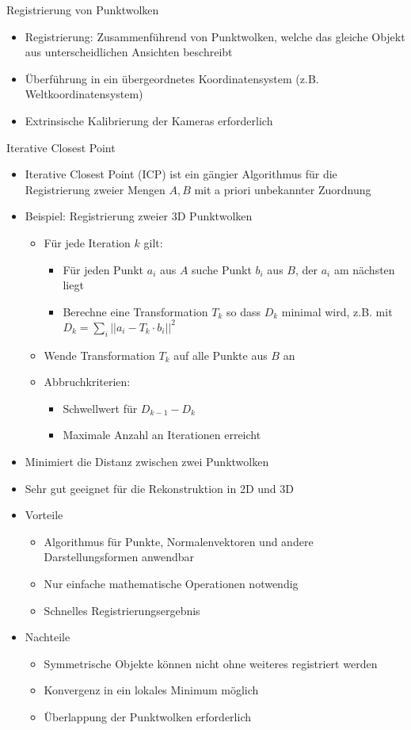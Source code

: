 \documentclass[paper=a4, fontsize=11pt]{scrartcl} %
\numberwithin{equation}{section} %
\numberwithin{figure}{section} %
\numberwithin{table}{section} %
\begin{document}
Registrierung von Punktwolken
\begin{itemize}
\item Registrierung: Zusammenführend von Punktwolken, welche das gleiche Objekt aus unterscheidlichen Ansichten beschreibt
\item Überführung in ein übergeordnetes Koordinatensystem (z.B. Weltkoordinatensystem)
\item Extrinsische Kalibrierung der Kameras erforderlich
\end{itemize}

Iterative Closest Point
\begin{itemize}
\item Iterative Closest Point (ICP) ist ein gängier Algorithmus für die Registrierung zweier Mengen $A,B$ mit a priori unbekannter Zuordnung
\item Beispiel: Registrierung zweier 3D Punktwolken
\begin{itemize}
\item Für jede Iteration $k$ gilt:
\begin{itemize}
\item Für jeden Punkt $a_i$ aus $A$ suche Punkt $b_i$ aus $B$, der $a_i$ am nächsten liegt
\item Berechne eine Transformation $T_k$ so dass $D_k$ minimal wird, z.B. mit $D_k = \sum_i ||a_i - T_k \cdot b_i ||^2$
\end{itemize}
\item Wende Transformation $T_k$ auf alle Punkte aus $B$ an
\item Abbruchkriterien:
\begin{itemize}
\item Schwellwert für $D_{k-1} - D_k$
\item Maximale Anzahl an Iterationen erreicht
\end{itemize}
\end{itemize}
\item Minimiert die Distanz zwischen zwei Punktwolken
\item Sehr gut geeignet für die Rekonstruktion in 2D und 3D
\item Vorteile
\begin{itemize}
\item Algorithmus für Punkte, Normalenvektoren und andere Darstellungsformen anwendbar
\item Nur einfache mathematische Operationen notwendig
\item Schnelles Registrierungsergebnis
\end{itemize}
\item Nachteile
\begin{itemize}
\item Symmetrische Objekte können nicht ohne weiteres registriert werden
\item Konvergenz in ein lokales Minimum möglich
\item Überlappung der Punktwolken erforderlich
\end{itemize}
\end{itemize}
\end{document}
